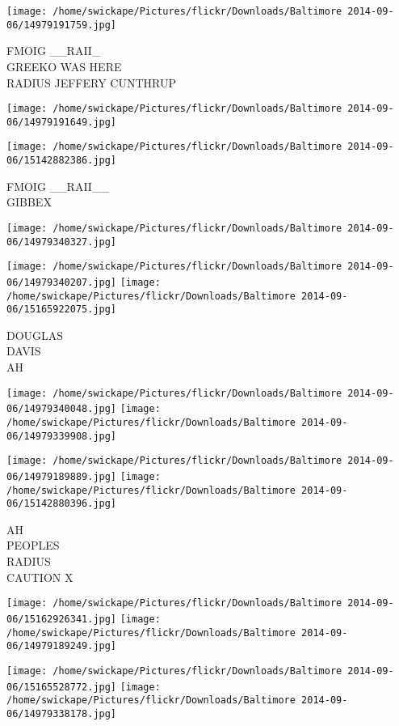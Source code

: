 \documentclass[10pt,letterpaper]{article}
\begin{document}
\vspace{0.25in}
\texttt{[image: /home/swickape/Pictures/flickr/Downloads/Baltimore 2014-09-06/14979191759.jpg]}

FMOIG \_\_RAII\_\\
GREEKO WAS HERE\\
RADIUS JEFFERY CUNTHRUP
\pagebreak

\texttt{[image: /home/swickape/Pictures/flickr/Downloads/Baltimore 2014-09-06/14979191649.jpg]}

\vspace{0.25in}
\texttt{[image: /home/swickape/Pictures/flickr/Downloads/Baltimore 2014-09-06/15142882386.jpg]}

FMOIG \_\_RAII\_\_\\
GIBBEX
\pagebreak

\texttt{[image: /home/swickape/Pictures/flickr/Downloads/Baltimore 2014-09-06/14979340327.jpg]}

\vspace{0.25in}
\texttt{[image: /home/swickape/Pictures/flickr/Downloads/Baltimore 2014-09-06/14979340207.jpg]}
\texttt{[image: /home/swickape/Pictures/flickr/Downloads/Baltimore 2014-09-06/15165922075.jpg]}

DOUGLAS\\
DAVIS\\
AH
\pagebreak

\texttt{[image: /home/swickape/Pictures/flickr/Downloads/Baltimore 2014-09-06/14979340048.jpg]}
\texttt{[image: /home/swickape/Pictures/flickr/Downloads/Baltimore 2014-09-06/14979339908.jpg]}

\texttt{[image: /home/swickape/Pictures/flickr/Downloads/Baltimore 2014-09-06/14979189889.jpg]}
\texttt{[image: /home/swickape/Pictures/flickr/Downloads/Baltimore 2014-09-06/15142880396.jpg]}

AH\\
PEOPLES\\
RADIUS\\
CAUTION X
\pagebreak

\texttt{[image: /home/swickape/Pictures/flickr/Downloads/Baltimore 2014-09-06/15162926341.jpg]}
\texttt{[image: /home/swickape/Pictures/flickr/Downloads/Baltimore 2014-09-06/14979189249.jpg]}

\texttt{[image: /home/swickape/Pictures/flickr/Downloads/Baltimore 2014-09-06/15165528772.jpg]}
\texttt{[image: /home/swickape/Pictures/flickr/Downloads/Baltimore 2014-09-06/14979338178.jpg]}
\end{document}
